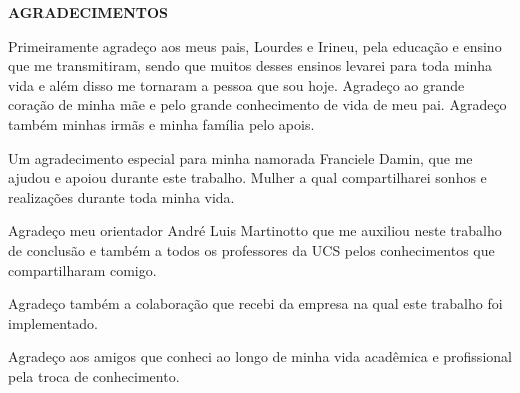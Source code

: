 \begin{center}
\textbf{AGRADECIMENTOS}
\end{center}

Primeiramente agradeço aos meus pais, Lourdes e Irineu, pela educação e ensino que me transmitiram, sendo que
muitos desses ensinos levarei para toda minha vida e além disso me tornaram a pessoa que sou hoje. Agradeço ao 
grande coração de minha mãe e pelo grande conhecimento de vida de meu pai. Agradeço também minhas irmãs e minha família pelo apois.

Um agradecimento especial para minha namorada Franciele Damin, que me ajudou e apoiou durante este trabalho. Mulher a qual compartilharei 
sonhos e realizações durante toda minha vida.

Agradeço meu orientador André Luis Martinotto que me auxiliou neste trabalho de conclusão e também a todos os professores da UCS pelos 
conhecimentos que compartilharam comigo.

Agradeço também a colaboração que recebi da empresa na qual este trabalho foi implementado.

Agradeço aos amigos que conheci ao longo de minha vida acadêmica e profissional pela troca de conhecimento.
